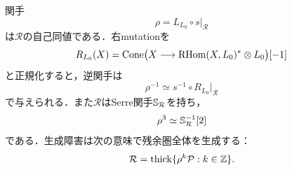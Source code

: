 \documentclass[11pt,a4paper]{ltjsarticle}
\begin{document}
\begin{theorem}[残余回転と一対象の軌道生成]\label{thm:residualrotation}
関手
\begin{equation}\label{eq:residualrotation}
 \rho=L_{L_0}\circ s\big|_{\mathcal R}
\end{equation}
は$\mathcal R$の自己同値である．右mutationを
\[
 R_{L_0}(X)=
 \operatorname{Cone}\bigl(X\longrightarrow
 \operatorname{RHom}(X,L_0)^*\otimes L_0\bigr)[-1]
\]
と正規化すると，逆関手は
\begin{equation}\label{eq:residualrotationinverse}
 \rho^{-1}\simeq s^{-1}\circ R_{L_0}\big|_{\mathcal R}
\end{equation}
で与えられる．また$\mathcal R$はSerre関手$\mathbb S_{\mathcal R}$を持ち，
\begin{equation}\label{eq:residualserre}
 \rho^3\simeq\mathbb S_{\mathcal R}^{-1}[2]
\end{equation}
である．生成障害は次の意味で残余圏全体を生成する：
\begin{equation}\label{eq:residualorbitgeneration}
 \mathcal R=\operatorname{thick}\{\rho^k\mathcal P:k\in\mathbb Z\}.
\end{equation}
\end{theorem}
\end{document}
